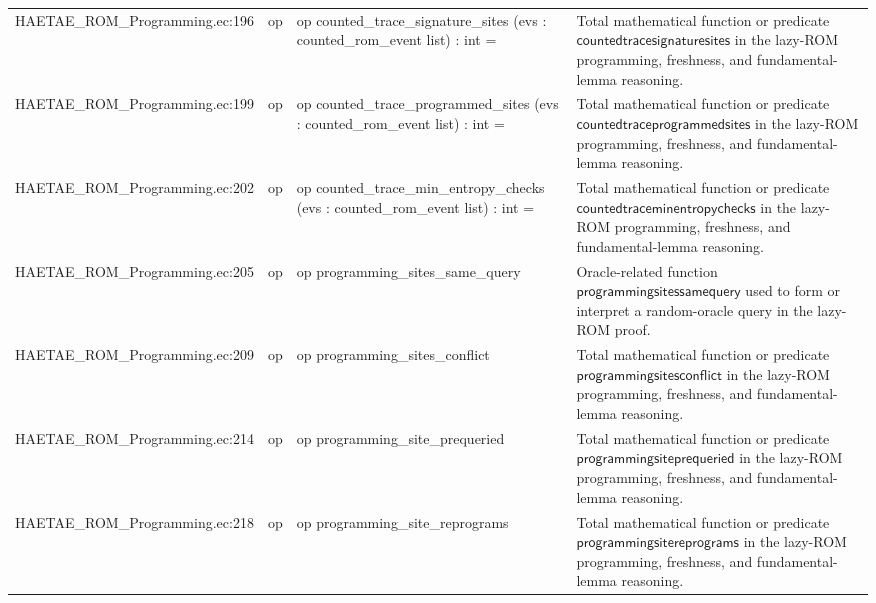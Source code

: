\documentclass[10pt]{article}
\begin{document}
\begin{longtable}{L{0.11\textwidth}L{0.055\textwidth}L{0.385\textwidth}L{0.41\textwidth}}
HAETAE\_\allowbreak{}ROM\_\allowbreak{}Programming.\allowbreak{}ec:\allowbreak{}196 & op & {\ttfamily\scriptsize op counted\_\allowbreak{}trace\_\allowbreak{}signature\_\allowbreak{}sites (evs : counted\_\allowbreak{}rom\_\allowbreak{}event list) : int =} & Total mathematical function or predicate $\mathsf{countedtracesignaturesites}$ in the lazy-ROM programming, freshness, and fundamental-lemma reasoning. \\
HAETAE\_\allowbreak{}ROM\_\allowbreak{}Programming.\allowbreak{}ec:\allowbreak{}199 & op & {\ttfamily\scriptsize op counted\_\allowbreak{}trace\_\allowbreak{}programmed\_\allowbreak{}sites (evs : counted\_\allowbreak{}rom\_\allowbreak{}event list) : int =} & Total mathematical function or predicate $\mathsf{countedtraceprogrammedsites}$ in the lazy-ROM programming, freshness, and fundamental-lemma reasoning. \\
HAETAE\_\allowbreak{}ROM\_\allowbreak{}Programming.\allowbreak{}ec:\allowbreak{}202 & op & {\ttfamily\scriptsize op counted\_\allowbreak{}trace\_\allowbreak{}min\_\allowbreak{}entropy\_\allowbreak{}checks (evs : counted\_\allowbreak{}rom\_\allowbreak{}event list) : int =} & Total mathematical function or predicate $\mathsf{countedtraceminentropychecks}$ in the lazy-ROM programming, freshness, and fundamental-lemma reasoning. \\
HAETAE\_\allowbreak{}ROM\_\allowbreak{}Programming.\allowbreak{}ec:\allowbreak{}205 & op & {\ttfamily\scriptsize op programming\_\allowbreak{}sites\_\allowbreak{}same\_\allowbreak{}query} & Oracle-related function $\mathsf{programmingsitessamequery}$ used to form or interpret a random-oracle query in the lazy-ROM proof. \\
HAETAE\_\allowbreak{}ROM\_\allowbreak{}Programming.\allowbreak{}ec:\allowbreak{}209 & op & {\ttfamily\scriptsize op programming\_\allowbreak{}sites\_\allowbreak{}conflict} & Total mathematical function or predicate $\mathsf{programmingsitesconflict}$ in the lazy-ROM programming, freshness, and fundamental-lemma reasoning. \\
HAETAE\_\allowbreak{}ROM\_\allowbreak{}Programming.\allowbreak{}ec:\allowbreak{}214 & op & {\ttfamily\scriptsize op programming\_\allowbreak{}site\_\allowbreak{}prequeried} & Total mathematical function or predicate $\mathsf{programmingsiteprequeried}$ in the lazy-ROM programming, freshness, and fundamental-lemma reasoning. \\
HAETAE\_\allowbreak{}ROM\_\allowbreak{}Programming.\allowbreak{}ec:\allowbreak{}218 & op & {\ttfamily\scriptsize op programming\_\allowbreak{}site\_\allowbreak{}reprograms} & Total mathematical function or predicate $\mathsf{programmingsitereprograms}$ in the lazy-ROM programming, freshness, and fundamental-lemma reasoning. \\

\end{longtable}
\end{document}
